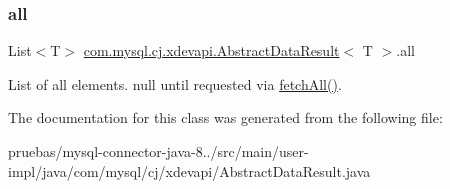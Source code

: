 \subsubsection{\texorpdfstring{all}{all}}
{\footnotesize\ttfamily List$<$T$>$ \mbox{\hyperlink{classcom_1_1mysql_1_1cj_1_1xdevapi_1_1_abstract_data_result}{com.\+mysql.\+cj.\+xdevapi.\+Abstract\+Data\+Result}}$<$ T $>$.all\hspace{0.3cm}{\ttfamily [protected]}}

List of all elements. {\ttfamily null} until requested via \mbox{\hyperlink{}{fetch\+All()}}. 

The documentation for this class was generated from the following file\+:\begin{DoxyCompactItemize}
\item 
pruebas/mysql-\/connector-\/java-\/8../src/main/user-\/impl/java/com/mysql/cj/xdevapi/Abstract\+Data\+Result.\+java\end{DoxyCompactItemize}
